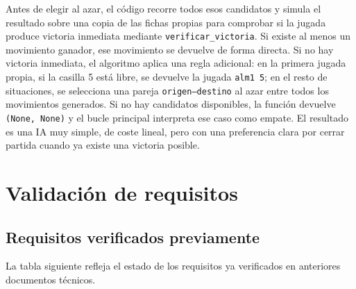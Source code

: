 \documentclass[12pt,a4paper]{article}
\begin{document}
Antes de elegir al azar, el código recorre todos esos candidatos y simula el resultado sobre una copia de las fichas propias para comprobar si la jugada produce victoria inmediata mediante \texttt{verificar\_victoria}. Si existe al menos un movimiento ganador, ese movimiento se devuelve de forma directa. Si no hay victoria inmediata, el algoritmo aplica una regla adicional: en la primera jugada propia, si la casilla 5 está libre, se devuelve la jugada \texttt{alm1 5}; en el resto de situaciones, se selecciona una pareja \texttt{origen--destino} al azar entre todos los movimientos generados. Si no hay candidatos disponibles, la función devuelve \texttt{(None, None)} y el bucle principal interpreta ese caso como empate. El resultado es una IA muy simple, de coste lineal, pero con una preferencia clara por cerrar partida cuando ya existe una victoria posible.
\section{Validación de requisitos}

\subsection{Requisitos verificados previamente}
La tabla siguiente refleja el estado de los requisitos ya verificados en anteriores documentos técnicos.
\end{document}
